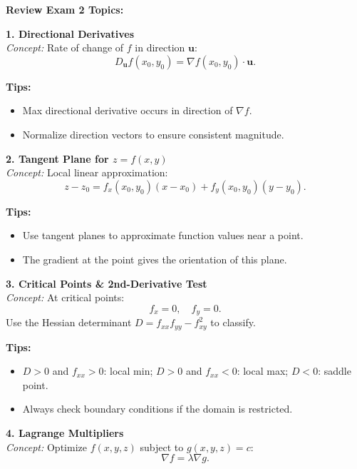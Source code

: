 \documentclass[9pt]{article}
\begin{document}
\begin{multicols}{2}
\footnotesize

\noindent \textbf{Review Exam 2 Topics:}

\begin{tcolorbox}[title=, colframe=brightpink]
\textbf{1. Directional Derivatives}\\
\textit{Concept:} Rate of change of $f$ in direction $\mathbf{u}$:
\[
D_{\mathbf{u}} f(x_0,y_0)=\nabla f(x_0,y_0)\cdot \mathbf{u}.
\]

\textbf{Tips:}
\begin{itemize}
    \item Max directional derivative occurs in direction of $\nabla f$.
    \item Normalize direction vectors to ensure consistent magnitude.
\end{itemize}
\end{tcolorbox}

\begin{tcolorbox}[title=, colframe=brightyellow]
\textbf{2. Tangent Plane for $z=f(x,y)$}\\
\textit{Concept:} Local linear approximation:
\[
z-z_0=f_x(x_0,y_0)(x-x_0)+f_y(x_0,y_0)(y-y_0).
\]

\textbf{Tips:}
\begin{itemize}
    \item Use tangent planes to approximate function values near a point.
    \item The gradient at the point gives the orientation of this plane.
\end{itemize}
\end{tcolorbox}

\begin{tcolorbox}[title=, colframe=brightblue]
\textbf{3. Critical Points \& 2nd-Derivative Test}\\
\textit{Concept:} At critical points:
\[
f_x=0,\quad f_y=0.
\]
Use the Hessian determinant $D=f_{xx}f_{yy}-f_{xy}^2$ to classify.

\textbf{Tips:}
\begin{itemize}
    \item $D>0$ and $f_{xx}>0$: local min; $D>0$ and $f_{xx}<0$: local max; $D<0$: saddle point.
    \item Always check boundary conditions if the domain is restricted.
\end{itemize}
\end{tcolorbox}

\begin{tcolorbox}[title=, colframe=brightgreen]
\textbf{4. Lagrange Multipliers}\\
\textit{Concept:} Optimize $f(x,y,z)$ subject to $g(x,y,z)=c$:
\[
\nabla f=\lambda \nabla g.
\]


\end{tcolorbox}
\end{multicols}
\end{document}
